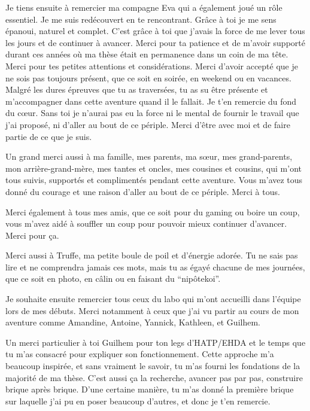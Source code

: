 
Je tiens ensuite à remercier ma compagne Eva qui a également joué un rôle essentiel. 
Je me suis redécouvert en te rencontrant. Grâce à toi je me sens épanoui, naturel et complet. C'est grâce à toi que j'avais la force de me lever tous les jours et de continuer à avancer. 
Merci pour ta patience et de m'avoir supporté durant ces années où ma thèse était en permanence dans un coin de ma tête.  
Merci pour tes petites attentions et considérations. 
Merci d'avoir accepté que je ne sois pas toujours présent, que ce soit en soirée, en weekend ou en vacances. 
Malgré les dures épreuves que tu as traversées, tu as su être présente et m'accompagner dans cette aventure quand il le fallait.
Je t'en remercie du fond du cœur.
Sans toi je n'aurai pas eu la force ni le mental de fournir le travail que j'ai proposé, ni d'aller au bout de ce périple. 
Merci d'être avec moi et de faire partie de ce que je suis. 



Un grand merci aussi à ma famille, mes parents, ma sœur, mes grand-parents, mon arrière-grand-mère, mes tantes et oncles, mes cousines et cousins, qui m'ont tous suivis, supportés et complimentés pendant cette aventure. Vous m'avez tous donné du courage et une raison d'aller au bout de ce périple. Merci à tous.

Merci également à tous mes amis, que ce soit pour du gaming ou boire un coup, vous m'avez aidé à souffler un coup pour pouvoir mieux continuer d'avancer. Merci pour ça.



Merci aussi à Truffe, ma petite boule de poil et d'énergie adorée. Tu ne sais pas lire et ne comprendra jamais ces mots, mais tu as égayé chacune de mes journées, que ce soit en photo, en câlin ou en faisant du ``nipôtekoi''.



Je souhaite ensuite remercier tous ceux du labo qui m'ont accueilli dans l'équipe lors de mes débuts. Merci notamment à ceux que j'ai vu partir au cours de mon aventure comme Amandine, Antoine, Yannick, Kathleen, et Guilhem.

Un merci particulier à toi Guilhem pour ton legs d'HATP/EHDA et le temps que tu m'as consacré pour expliquer son fonctionnement. 
Cette approche m'a beaucoup inspirée, et sans vraiment le savoir, tu m'as fourni les fondations de la majorité de ma thèse. C'est aussi ça la recherche, avancer pas par pas, construire brique après brique. D'une certaine manière, tu m'as donné la première brique sur laquelle j'ai pu en poser beaucoup d'autres, et donc je t'en remercie.

